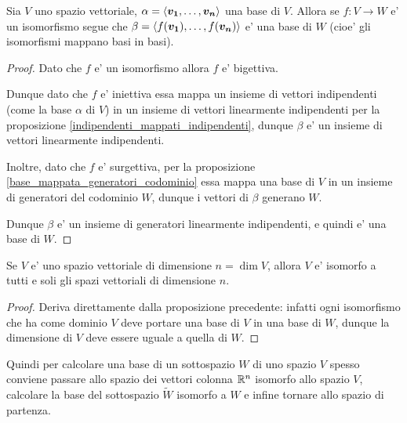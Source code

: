 \begin{proposition}
    Sia $V$ uno spazio vettoriale, $\alpha = \left\langle \bm{v_1}, \dots, \bm{v_n} \right\rangle$ una base di $V$. Allora se $f : V \to W$ e' un isomorfismo segue che $\beta = \left\langle f(\bm{v_1}), \dots, f(\bm{v_n}) \right\rangle$ e' una base di $W$ (cioe' gli isomorfismi mappano basi in basi).
\end{proposition}
\begin{proof}
    Dato che $f$ e' un isomorfismo allora $f$ e' bigettiva.

    Dunque dato che $f$ e' iniettiva essa mappa un insieme di vettori indipendenti (come la base $\alpha$ di $V$) in un insieme di vettori linearmente indipendenti per la proposizione \ref{indipendenti_mappati_indipendenti}, dunque $\beta$ e' un insieme di vettori linearmente indipendenti. 

    Inoltre, dato che $f$ e' surgettiva, per la proposizione \ref{base_mappata_generatori_codominio} essa mappa una base di $V$ in un insieme di generatori del codominio $W$, dunque i vettori di $\beta$ generano $W$.

    Dunque $\beta$ e' un insieme di generatori linearmente indipendenti, e quindi e' una base di $W$.
\end{proof}

\begin{proposition}
    Se $V$ e' uno spazio vettoriale di dimensione $n = \dim V$, allora $V$ e' isomorfo a tutti e soli gli spazi vettoriali di dimensione $n$.
\end{proposition}
\begin{proof}
    Deriva direttamente dalla proposizione precedente: infatti ogni isomorfismo che ha come dominio $V$ deve portare una base di $V$ in una base di $W$, dunque la dimensione di $V$ deve essere uguale a quella di $W$.
\end{proof}

Quindi per calcolare una base di un sottospazio $W$ di uno spazio $V$ spesso conviene passare allo spazio dei vettori colonna $\mathbb{R}^n$ isomorfo allo spazio $V$, calcolare la base del sottospazio $\tilde{W}$ isomorfo a $W$ e infine tornare allo spazio di partenza.

